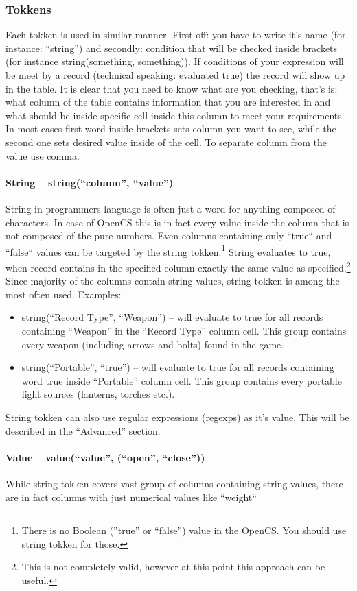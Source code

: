\subsubsection{Tokkens}
Each tokken is used in similar manner. First off: you have to write it's name (for instance: ``string'') and secondly: condition that will be checked inside brackets (for instance string(something, something)). If conditions of your expression will be meet by a record (technical speaking: evaluated true) the record will show up in the table.
\linebreak
It is clear that you need to know what are you checking, that's is: what column of the table contains information that you are interested in and what should be inside specific cell inside this column to meet your requirements. In most cases first word inside brackets sets column you want to see, while the second one sets desired value inside of the cell. To separate column from the value use comma.  

\paragraph{String -- string(``column'', ``value'')}
String in programmers language is often just a word for anything composed of characters. In case of OpenCS this is in fact every value inside the column that is not composed of the pure numbers. Even columns containing only ``true`` and ``false`` values can be targeted by the string tokken.\footnote{There is no Boolean (''true'' or ``false'') value in the OpenCS. You should use string tokken for those.} String evaluates to true, when record contains in the specified column exactly the same value as specified.\footnote{This is not completely valid, however at this point this approach can be useful.}
\linebreak
Since majority of the columns contain string values, string tokken is among the most often used. Examples:
\begin{itemize}
 \item string(``Record Type'', ``Weapon'') -- will evaluate to true for all records containing ``Weapon'' in the ``Record Type'' column cell. This group contains every weapon (including arrows and bolts) found in the game.
 \item string(``Portable'', ``true'') -- will evaluate to true for all records containing word true inside ``Portable'' column cell. This group contains every portable light sources (lanterns, torches etc.).
\end{itemize}
String tokken can also use regular expressions (regexps) as it's value. This will be described in the ``Advanced'' section.

\paragraph{Value -- value(``value'', (``open'', ``close''))}
While string tokken covers vast group of columns containing string values, there are in fact columns with just numerical values like ``weight``